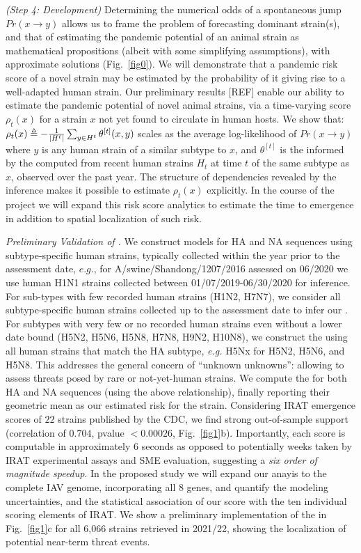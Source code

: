\documentclass[onecolumn, compsoc,12pt]{IEEEtran}
\begin{document}
\textit{(Step 4: \bnd Development)} Determining the numerical odds of a spontaneous jump $ Pr(x \rightarrow y)$  allows us to frame the problem of forecasting  dominant strain(s), and that of estimating the  pandemic potential of an animal strain as  mathematical propositions (albeit with some simplifying assumptions), with  approximate solutions (Fig.~\ref{fig0}). We will demonstrate that a pandemic risk score of a novel strain may be estimated by the probability of it giving rise to a well-adapted human strain. 
Our preliminary results [REF] enable our ability to estimate the pandemic potential of novel animal strains, via a  time-varying \erisk score $\rho_t(x)$ for a strain $x$ not yet found to circulate in human hosts. We show that: $
\rho_t(x) \triangleq -\frac{1}{\left\lvert H^t \right\rvert} \sum_{y \in H^t} \theta^{[t]}(x,y)
$ scales as the average log-likelihood of $Pr(x \rightarrow y)$ where $y$ is any human strain of a similar subtype to $x$, and  $\theta^{[t]}$ is the \qdist informed by the \enet computed from recent human strains $H_t$ at time $t$ of the same subtype as $x$, observed over the past year. The structure of dependencies revealed by the \enet inference makes it possible to estimate $\rho_t(x)$ explicitly. In the course of the project we will expand this risk score analytics to estimate the time to emergence in addition to spatial localization of such risk.
 
\textit{Preliminary Validation of \bnd.} We construct \enet models for HA and NA sequences using subtype-specific human strains, typically collected within the  year prior to the assessment date, $e.g.$,   for A/swine/Shandong/1207/2016 assessed on 06/2020 we  use human H1N1 strains collected  between 01/07/2019-06/30/2020 for  \enet inference. For sub-types with few  recorded human strains (H1N2, H7N7), we consider all subtype-specific human strains collected up to the  assessment date  to infer our \enet. For subtypes with very few or no recorded human strains even without a lower date bound (H5N2, H5N6, H5N8, H7N8, H9N2, H10N8), we construct the \enet using all human strains that match the HA subtype, \textit{e.g.} H5Nx for H5N2, H5N6, and H5N8. This addresses the general concern of ``unknown unknowns'': allowing  \enet to assess  threats posed by rare or not-yet-human strains. We  compute the \erisk for both HA and NA sequences (using the above relationship),  finally reporting their geometric mean as our estimated risk for the strain. Considering IRAT emergence scores of $22$ strains published by the CDC, we find strong out-of-sample support  (correlation of $0.704$, pvalue $<0.00026$, Fig.~\ref{fig1}b). Importantly, each \erisk score  is  computable in approximately $6$ seconds as opposed to potentially weeks taken by IRAT experimental assays and SME evaluation, suggesting a \textit{six order of magnitude speedup}. In the proposed study we will expand our anayis to the complete IAV genome, incorporating all 8 genes, and quantify the modeling uncertainties, and the statistical association of our score with the ten individual scoring elements of IRAT. We show a preliminary implementation of the \bnd in Fig.~\ref{fig1}c for all 6,066 strains retrieved in 2021/22, showing the localization of potential near-term threat events.
\end{document}
